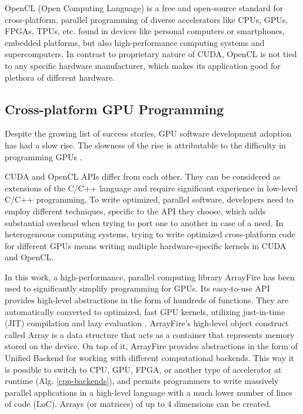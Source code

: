 OpenCL (Open Computing Language) is a free and open-source standard for cross-platform, parallel programming of diverse accelerators like CPUs, GPUs, FPGAs, TPUs, etc. found in devices like personal computers or smartphones, embedded platforms, but also high-performance computing systems and supercomputers. In contrast to proprietary nature of CUDA, OpenCL is not tied to any specific hardware manufacturer, which makes its application good for plethora of different hardware.

\subsection{Cross-platform GPU Programming}
\label{sec:computer-simulations-using-gpus}

Despite the growing list of success stories, GPU software development adoption has had a slow rise. The slowness of the rise is attributable to the difficulty in programming GPUs \citep{malcolmArrayFireGPUAcceleration2012a}.

\citep{karimiPerformanceComparisonCUDAa}

CUDA and OpenCL APIs differ from each other. They can be considered as extensions of the C/C++ language and require significant experience in low-level C/C++ programming. To write optimized, parallel software, developers need to employ different techniques, specific to the API they choose, which adds substantial overhead when trying to port one to another in case of a need. In heterogeneous computing systems, trying to write optimized cross-platform code for different GPUs means writing multiple hardware-specific kernels in CUDA and OpenCL.

In this work, a high-performance, parallel computing library ArrayFire has been used to significantly simplify programming for GPUs. Its easy-to-use API provides high-level abstractions in the form of hundreds of functions. They are automatically converted to optimized, fast GPU kernels, utilizing just-in-time (JIT) compilation and lazy evaluation \cite{chrzeszczykMatrixComputationsGPUb}. ArrayFire's high-level object construct called Array is a data structure that acts as a container that represents memory stored on the device. On top of it, ArrayFire provides abstractions in the form of Unified Backend for working with different computational backends. This way it is possible to switch to CPU, GPU, FPGA, or another type of accelerator at runtime \cite{Yalamanchili2015} (Alg. \ref{cpp-backends}), and permits programmers to write massively parallel applications in a high-level language with a much lower number of lines of code (LoC). Arrays (or matrices) of up to 4 dimensions can be created. 

